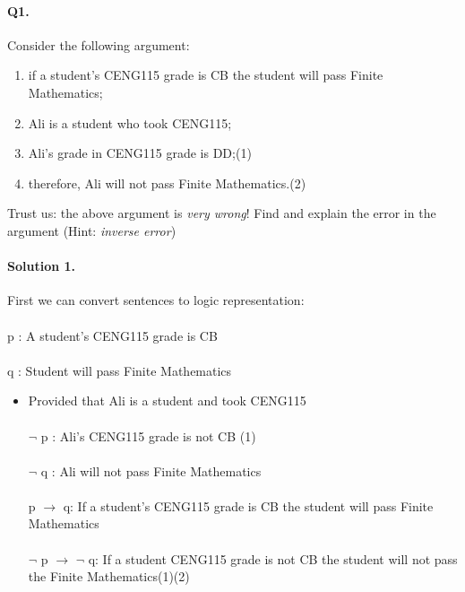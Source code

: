 \documentclass[11pt]{article}
\begin{document}
\pagestyle{myheadings}

\paragraph{Q1.} Consider the following argument:
\begin{enumerate}
\item if a student's CENG115 grade is CB the student will pass Finite Mathematics;
\item Ali is a student who took CENG115;
\item Ali's grade in CENG115 grade is DD;(1)
\item therefore, Ali will not pass Finite Mathematics.(2)
\end{enumerate}
Trust us: the above argument is \emph{very wrong}! Find and explain the error
in the argument (Hint: \emph{inverse error})

\paragraph{Solution 1.} First we can convert sentences to logic representation:
\paragraph{}p				 : A student's CENG115 grade is CB
\paragraph{}q				 : Student will pass Finite Mathematics\\
\begin{itemize}
\item{Provided that Ali is a student and took CENG115}
\paragraph{}$\neg$ p : Ali's CENG115 grade is not CB (1)
\paragraph{}$\neg$ q :	Ali will not pass Finite Mathematics
\paragraph{}p $\rightarrow$ q: If a student's CENG115 grade is CB the student will pass Finite Mathematics
\paragraph{}$\neg$ p $\rightarrow$ $\neg$ q: If a student CENG115 grade is not CB the student will not pass the Finite Mathematics(1)(2)
\end{itemize}
\end{document}
